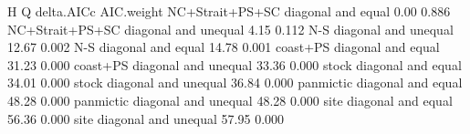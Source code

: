 \begin{Schunk}
\begin{Soutput}
               H                    Q delta.AICc AIC.weight
 NC+Strait+PS+SC   diagonal and equal       0.00      0.886
 NC+Strait+PS+SC diagonal and unequal       4.15      0.112
             N-S diagonal and unequal      12.67      0.002
             N-S   diagonal and equal      14.78      0.001
        coast+PS   diagonal and equal      31.23      0.000
        coast+PS diagonal and unequal      33.36      0.000
           stock   diagonal and equal      34.01      0.000
           stock diagonal and unequal      36.84      0.000
       panmictic   diagonal and equal      48.28      0.000
       panmictic diagonal and unequal      48.28      0.000
            site   diagonal and equal      56.36      0.000
            site diagonal and unequal      57.95      0.000
\end{Soutput}
\end{Schunk}
